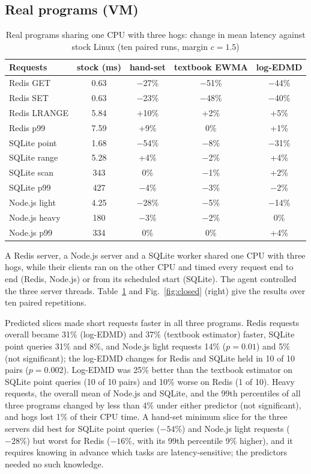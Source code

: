 \documentclass[conference,onecolumn,11pt]{IEEEtran}
\begin{document}
\subsection{Real programs (VM)}\label{sec:realloop}
\begin{table}[t]
\centering
\caption{Real programs sharing one CPU with three hogs: change in mean latency against stock Linux (ten paired runs, margin $c=1.5$)}\label{tab:realloop}
\begin{tabular}{@{}lcccc@{}}
\toprule
Requests & stock (ms) & hand-set & textbook EWMA & log-EDMD \\
\midrule
Redis GET & 0.63 & $-$27\% & $-$51\% & $-$44\% \\
Redis SET & 0.63 & $-$23\% & $-$48\% & $-$40\% \\
Redis LRANGE & 5.84 & +10\% & +2\% & +5\% \\
Redis p99 & 7.59 & +9\% & 0\% & +1\% \\
SQLite point & 1.68 & $-$54\% & $-$8\% & $-$31\% \\
SQLite range & 5.28 & +4\% & $-$2\% & +4\% \\
SQLite scan & 343 & 0\% & $-$1\% & +2\% \\
SQLite p99 & 427 & $-$4\% & $-$3\% & $-$2\% \\
Node.js light & 4.25 & $-$28\% & $-$5\% & $-$14\% \\
Node.js heavy & 180 & $-$3\% & $-$2\% & 0\% \\
Node.js p99 & 334 & 0\% & 0\% & +4\% \\
\bottomrule
\end{tabular}
\end{table}

A Redis server, a Node.js server and a SQLite worker shared one CPU with three hogs, while their clients ran on the other CPU and timed every request end to end (Redis, Node.js) or from its scheduled start (SQLite). The agent controlled the three server threads. Table~\ref{tab:realloop} and Fig.~\ref{fig:closed} (right) give the results over ten paired repetitions.

Predicted slices made short requests faster in all three programs. Redis requests overall became 31\% (log-EDMD) and 37\% (textbook estimator) faster, SQLite point queries 31\% and 8\%, and Node.js light requests 14\% ($p=0.01$) and 5\% (not significant); the log-EDMD changes for Redis and SQLite held in 10 of 10 pairs ($p=0.002$). Log-EDMD was 25\% better than the textbook estimator on SQLite point queries (10 of 10 pairs) and 10\% worse on Redis (1 of 10). Heavy requests, the overall mean of Node.js and SQLite, and the 99th percentiles of all three programs changed by less than 4\% under either predictor (not significant), and hogs lost 1\% of their CPU time. A hand-set minimum slice for the three servers did best for SQLite point queries ($-54\%$) and Node.js light requests ($-28\%$) but worst for Redis ($-16\%$, with its 99th percentile 9\% higher), and it requires knowing in advance which tasks are latency-sensitive; the predictors needed no such knowledge.
\end{document}
